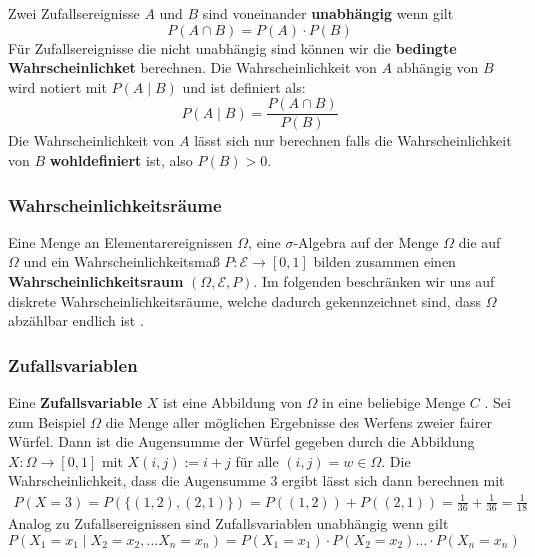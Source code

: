 Zwei Zufallsereignisse $A$ und $B$ sind voneinander \textbf{unabhängig} wenn gilt
\begin{equation}
    P(A \cap B) = P(A) \cdot P(B)
\end{equation}
Für Zufallsereignisse die nicht unabhängig sind können wir die \textbf{bedingte Wahrscheinlichket} berechnen. Die Wahrscheinlichkeit von $A$ abhängig von $B$ wird notiert mit $P(A \mid B)$ und ist definiert als:
\begin{equation}
    P(A \mid B) = \frac{P(A \cap B)}{P(B)}
\end{equation}
Die Wahrscheinlichkeit von $A$ lässt sich nur berechnen falls die Wahrscheinlichkeit von $B$ \textbf{wohldefiniert} ist, also $P(B) > 0$.

\subsubsection*{Wahrscheinlichkeitsräume}
Eine Menge an Elementarereignissen $\Omega$, eine $\sigma$-Algebra auf der Menge $\Omega$ die auf $\Omega$ und ein Wahrscheinlichkeitsmaß $P: \mathcal{E}\rightarrow [0,1]$ bilden zusammen einen \textbf{Wahrscheinlichkeitsraum} $(\Omega, \mathcal{E}, P)$. Im folgenden beschränken wir uns auf diskrete Wahrscheinlichkeitsräume, welche dadurch gekennzeichnet sind, dass $\Omega$ abzählbar endlich ist \cite{ElementareStochastic}.

\subsubsection*{Zufallsvariablen}
Eine \textbf{Zufallsvariable} $X$ ist eine Abbildung von $\Omega$ in eine beliebige Menge $C$ \cite{ElementareStochastic}. Sei zum Beispiel $\Omega$ die Menge aller möglichen Ergebnisse des Werfens zweier fairer Würfel. Dann ist die Augensumme der Würfel gegeben durch die Abbildung $X: \Omega \rightarrow [0,1]$ mit $X(i, j) := i + j$ für alle $(i,j ) = w \in \Omega$. Die Wahrscheinlichkeit, dass die Augensumme 3 ergibt lässt sich dann berechnen mit
\begin{align*}
    P(X=3) = P(\{(1,2), (2,1)\}) = P((1,2)) + P((2,1)) = \frac{1}{36} + \frac{1}{36} = \frac{1}{18}
\end{align*}
Analog zu Zufallsereignissen sind Zufallsvariablen unabhängig wenn gilt
\begin{equation}
    P(X_1 = x_1 \mid X_2=x_2, \dots X_n=x_n) = P(X_1=x_1) \cdot P(X_2=x_2)  \dots \cdot P(X_n=x_n)
\end{equation}

